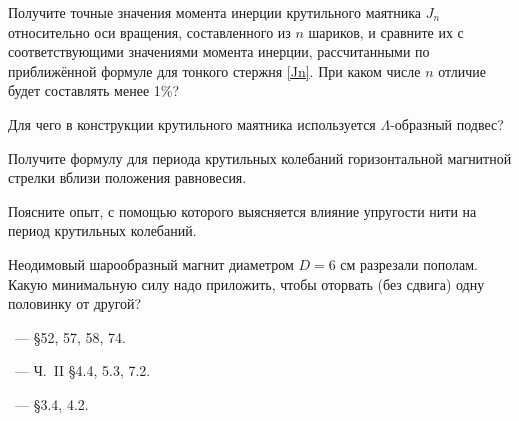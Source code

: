 \begin{lab:questions}
\item Получите точные значения момента инерции крутильного маятника $J_n$
относительно оси вращения, составленного из  $n$ шариков, и сравните
их с соответствующими значениями момента инерции, рассчитанными по приближённой
формуле для тонкого стержня \eqref{Jn}. При каком числе $n$
отличие будет составлять менее 1\%?

\item Для чего в конструкции крутильного маятника используется $\Lambda$-образный
подвес?

\item Получите формулу для периода крутильных колебаний горизонтальной магнитной
стрелки вблизи положения равновесия.

\item Поясните опыт, с помощью которого выясняется влияние упругости нити на
период крутильных колебаний.

\item Неодимовый шарообразный магнит диаметром $D=6$ см разрезали пополам. Какую
минимальную силу надо приложить, чтобы оторвать (без сдвига) одну половинку от
другой? 


\end{lab:questions}

\begin{lab:literature}
    \item \SivuhinIII~--- \S 52, 57, 58, 74.
    \item \KingLokOlh~--- Ч.~II \S 4.4, 5.3, 7.2.
    \item \Kirichenko~--- \S 3.4, 4.2.
\end{lab:literature}

